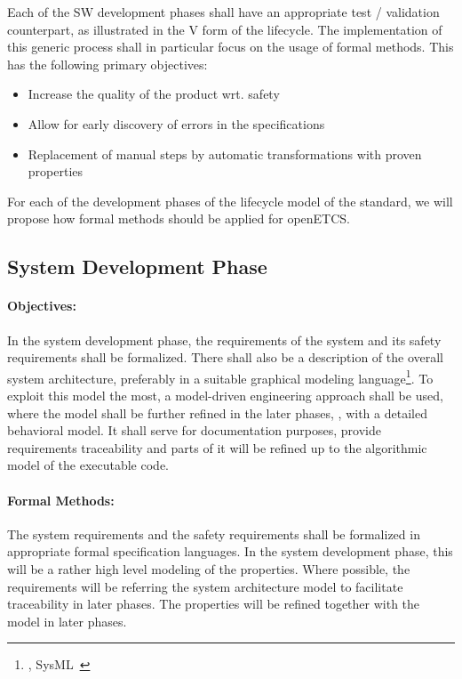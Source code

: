 Each of the SW development phases shall have an appropriate test / validation
counterpart, as illustrated in the V form of the lifecycle. The implementation
of this generic process shall in particular focus on the usage of formal
methods. This has the following primary objectives:

\begin{itemize}
\item Increase the quality of the product wrt. safety
\item Allow for early discovery of errors in the  specifications
\item Replacement of manual steps by automatic transformations with proven
  properties
\end{itemize}

For each of the development phases of the lifecycle model of the standard, we
will propose how formal methods should be applied for openETCS.

\subsection{System Development Phase}
\label{sec:syst-devel-phase}

\paragraph{Objectives:}
\label{sec:sys-dev-objective}
In the system development phase, the requirements of the system and its safety
requirements shall be formalized. There shall also be a description of the
overall system architecture, preferably in a suitable graphical modeling
language\footnote{\eg, SysML~\cite{SysMLSpec}}. To exploit this model the most,
a model-driven engineering approach shall be used, where the model shall be
further refined in the later phases, \eg, with a detailed behavioral model. It
shall serve for documentation purposes, provide requirements traceability and
parts of it will be refined up to the algorithmic model of the executable code.

\paragraph{Formal Methods:}
\label{sec:sys-dev-formal-methods}
The system requirements and the safety requirements shall be formalized in
appropriate formal specification languages. In the system development phase,
this will be a rather high level modeling of the properties. Where possible, the
requirements will be referring the system architecture model to facilitate
traceability in later phases. The properties will be refined together with the
model in later phases.


